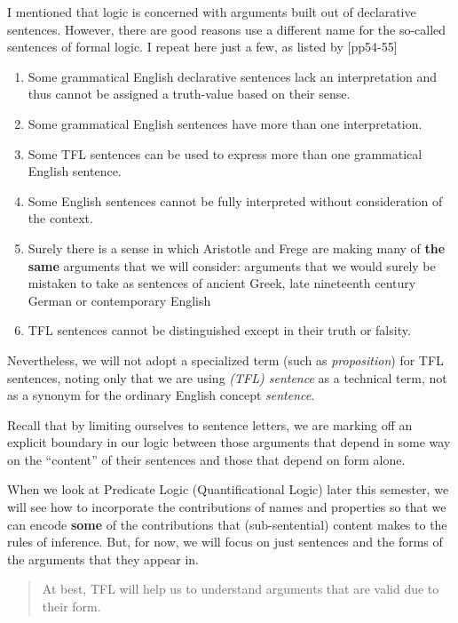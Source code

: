 I mentioned that logic is concerned with arguments built out of declarative
sentences. However, there are good reasons use a different name for the
so-called sentences of formal logic. I repeat here just a few, as listed by
\cite{Smi20}[pp54-55]

\begin{observation}
  \begin{enumerate}
  \item Some grammatical English declarative sentences lack an interpretation
    and thus cannot be assigned a truth-value based on their sense.
  \item Some grammatical English sentences have more than one interpretation.
  \item Some TFL sentences can be used to express more than one grammatical
    English sentence.
  \item Some English sentences cannot be fully interpreted without consideration
    of the context.
  \item Surely there is a sense in which Aristotle and Frege are making many of
    \textbf{the same} arguments that we will consider: arguments that we would
    surely be mistaken to take as sentences of ancient Greek, late nineteenth
    century German or contemporary English
  \item TFL sentences cannot be distinguished except in their truth or falsity.
  \end{enumerate}
\end{observation}

Nevertheless, we will not adopt a specialized term (such as \emph{proposition})
for TFL sentences, noting only that we are using \emph{(TFL) sentence} as a
technical term, not as a synonym for the ordinary English concept
\emph{sentence}.

Recall that by limiting ourselves to sentence letters, we are marking off an
explicit boundary in our logic between those arguments that depend in some
way on the ``content'' of their sentences and those that depend on form alone.

When we look at Predicate Logic (Quantificational Logic) later this semester,
we will see how to incorporate the contributions of names and properties so
that we can encode \textbf{some} of the contributions that (sub-sentential)
content makes to the rules of inference. But, for now, we will focus on just
sentences and the forms of the arguments that they appear in.

\begin{quote}
  At best, TFL will help us to understand arguments that are valid due to
  their form. \cite[][p30]{Mag25}
\end{quote}

